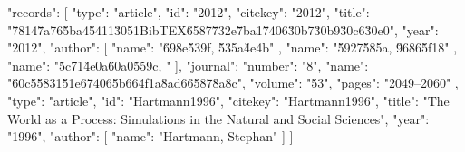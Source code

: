 \documentclass[uplatex,a4j]{jsarticle}
\begin{document}
 {
 "records": [
  {
   "type": "article",
   "id": "2012",
   "citekey": "2012",
   "title": "\u7814\u7a76\u5ba4\u5411\u3051BibTEX\u6587\u732e\u7ba1\u7406\u30b7\u30b9\u30c6\u30e0",
   "year": "2012",
   "author": [
    {
     "name": "\u698e\u539f, \u535a\u4e4b"
    },
    {
     "name": "\u5927\u585a, \u9686\u5f18"
    },
    {
     "name": "\u5c71\u4e0a\u60a0\u559c, "
    }
   ],
   "journal": {
    "number": "8",
    "name": "\u60c5\u5831\u51e6\u7406\u5b66\u4f1a\u8ad6\u6587\u8a8c",
    "volume": "53",
    "pages": "2049--2060"
   }
  },
  {
   "type": "article",
   "id": "Hartmann1996",
   "citekey": "Hartmann1996",
   "title": "The World as a Process: Simulations in the Natural and Social Sciences",
   "year": "1996",
   "author": [
    {
     "name": "Hartmann, Stephan"
    }
   ]
  }
 ]
} 
\end{document}
